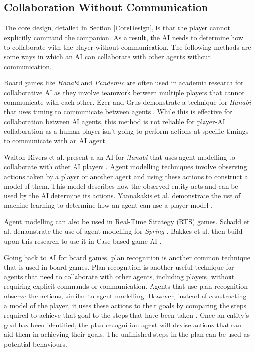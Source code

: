 \documentclass{IEEEtran}
\begin{document}
\subsection{Collaboration Without Communication}
\label{Communication}

The core design, detailed in Section \ref{CoreDesign}, is that the player cannot explicitly command the companion. As a result, the AI needs to determine how to collaborate with the player without communication. The following methods are some ways in which an AI can collaborate with other agents without communication.

Board games like \textit{Hanabi} and \textit{Pandemic} are often used in academic research for collaborative AI as they involve teamwork between multiple players that cannot communicate with each-other. Eger and Grus demonstrate a technique for \textit{Hanabi} that uses timing to communicate between agents \cite{WaitASecond2019}. While this is effective for collaboration between AI agents, this method is not reliable for player-AI collaboration as a human player isn't going to perform actions at specific timings to communicate with an AI agent.

Walton-Rivers et al. present a an AI for \textit{Hanabi} that uses agent modelling to collaborate with other AI players \cite{EvaluatingHanabiAgents}. Agent modelling techniques involve observing actions taken by a player or another agent and using these actions to construct a model of them. This model describes how the observed entity acts and can be used by the AI determine its actions. Yannakakis et al. demonstrate the use of machine learning to determine how an agent can use a player model \cite{yannakakis2013playermodelling}.

Agent modelling can also be used in Real-Time Strategy (RTS) games. Schadd et al. demonstrate the use of agent modelling for \textit{Spring} \cite{OpponentModellingRTS2007}. Bakkes et al. then build upon this research to use it in Case-based game AI \cite{bakkes2009opponentmodelling}.


Going back to AI for board games, plan recognition is another common technique that is used in board games. Plan recognition is another useful technique for agents that need to collaborate with other agents, including players, without requiring explicit commands or communication. Agents that use plan recognition observe the actions, similar to agent modelling. However, instead of constructing a model of the player, it uses these actions to their goals by comparing the steps required to achieve that goal to the steps that have been taken \cite{GeneratingCollabBehaviourPlanRecognition2016}. Once an entity’s goal has been identified, the plan recognition agent will devise actions that can aid them in achieving their goals. The unfinished steps in the plan can be used as potential behaviours.
\end{document}
